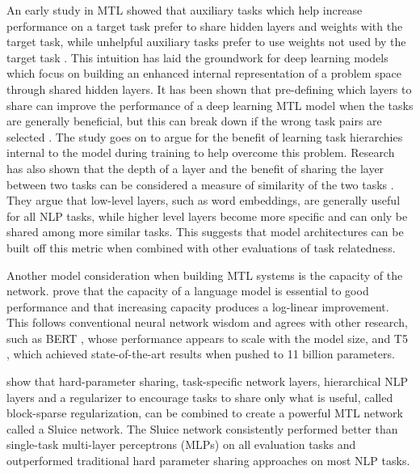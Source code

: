\documentclass[twocolumn]{article}
\begin{document}
An early study in MTL showed that auxiliary tasks which help increase performance on a target task prefer to share hidden layers and weights with the target task, while unhelpful auxiliary tasks prefer to use weights not used by the target task \citep{mtl97}. This intuition has laid the groundwork for deep learning models which focus on building an enhanced internal representation of a problem space through shared hidden layers. It has been shown that pre-defining which layers to share can improve the performance of a deep learning MTL model when the tasks are generally beneficial, but this can break down if the wrong task pairs are selected \citep{mtloverview17}. The study goes on to argue for the benefit of learning task hierarchies internal to the model during training to help overcome this problem. Research has also shown that the depth of a layer and the benefit of sharing the layer between two tasks can be considered a measure of similarity of the two tasks \citep{howtrans16}. They argue that low-level layers, such as word embeddings, are generally useful for all NLP tasks, while higher level layers become more specific and can only be shared among more similar tasks. This suggests that model architectures can be built off this metric when combined with other evaluations of task relatedness.

Another model consideration when building MTL systems is the capacity of the network. \cite{gpt19} prove that the capacity of a language model is essential to good performance and that increasing capacity produces a log-linear improvement. This follows conventional neural network wisdom and agrees with other research, such as BERT \citep{bert19}, whose performance appears to scale with the model size, and T5 \citep{t519}, which achieved state-of-the-art results when pushed to 11 billion parameters.

\cite{sluice17} show that hard-parameter sharing, task-specific network layers, hierarchical NLP layers and a regularizer to encourage tasks to share only what is useful, called block-sparse regularization, can be combined to create a powerful MTL network called a Sluice network. The Sluice network consistently performed better than single-task multi-layer perceptrons (MLPs) on all evaluation tasks and outperformed traditional hard parameter sharing approaches \citep{mtl97} on most NLP tasks.
\end{document}

